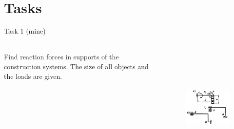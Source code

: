\documentclass[aspectratio=169]{beamer}
\begin{document}
\section*{Tasks}

\begin{frame}[t]{Task 1 (mine)}
    \framesubtitle{}
    \begin{columns}[T,onlytextwidth]
        \begin{column}{0.49\textwidth}
            Find reaction forces in supports of the construction systems. The size of all objects and the loads are given.
        \end{column}
        \begin{column}{0.49\textwidth}
            \begin{figure}[H]
                \centering\includegraphics[height=6cm,width=1\textwidth,keepaspectratio]{image21.png}
            \end{figure}
        \end{column}
    \end{columns}
    \end{frame}
\end{document}
